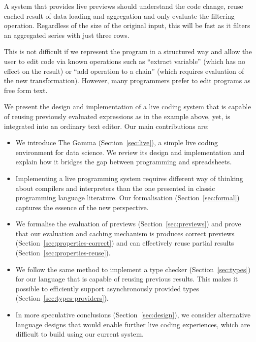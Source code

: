 \documentclass[sigplan,10pt]{acmart}\settopmatter{printfolios=true,printccs=false,printacmref=false}
\theoremstyle{plain}
\theoremstyle{definition}
\begin{document}

A system that provides live previews should understand the code change, reuse cached result of data 
loading and aggregation and only evaluate the filtering operation. Regardless of the size of the 
original input, this will be fast as it filters an aggregated series with just three rows.

This is not difficult if we represent the program in a structured way \cite{structure-based,hazelnut} 
and allow the user to edit code via known operations such as ``extract variable'' (which has
no effect on the result) or ``add operation to a chain'' (which requires evaluation of the new
transformation). However, many programmers prefer to edit programs as free form text.

We present the design and implementation of a live coding system that is capable
of reusing previously evaluated expressions as in the example above, yet, is integrated into an
ordinary text editor. Our main contributions are:

\begin{itemize}[itemsep=3pt]
\item We introduce The Gamma (Section~\ref{sec:live}), a simple live coding environment for
  data science. We review its design and implementation and explain how it 
  bridges the gap between programming and spreadsheets.

\item Implementing a live programming system requires different way of thinking about compilers
  and interpreters than the one presented in classic programming language literature. Our 
  formalisation (Section~\ref{sec:formal}) captures the essence of the new perspective.

\item We formalise the evaluation of previews (Section~\ref{sec:previews}) and prove that our
  evaluation and caching mechanism is produces correct previews (Section~\ref{sec:properties-correct}) 
  and can effectively reuse partial results (Section~\ref{sec:properties-reuse}).

\item We follow the same method to implement a type checker (Section~\ref{sec:types}) for our
  language that is capable of reusing previous results. This makes it possible to efficiently support
  asynchronously provided types (Section~\ref{sec:types-providers}).

\item In more speculative conclusions (Section~\ref{sec:design}), we consider alternative
  language designs that would enable further live coding experiences, which are difficult to
  build using our current system.
\end{itemize}
\end{document}
